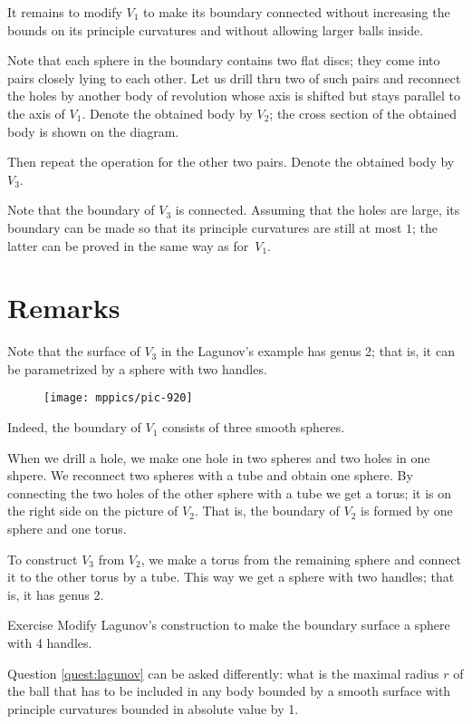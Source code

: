It remains to modify $V_1$ to make its boundary connected without increasing the bounds on its principle curvatures and  without allowing larger balls inside.

Note that each sphere in the boundary contains two flat discs;
they come into pairs closely lying to each other. 
Let us drill thru two of such pairs and reconnect the holes by another body of revolution whose 
axis is shifted but stays parallel to the axis of $V_1$.
Denote the obtained body by $V_2$; the cross section of the obtained body is shown on the diagram. 

Then repeat the operation for the other two pairs.
Denote the obtained body by $V_3$.

Note that the boundary of $V_3$ is connected.
Assuming that the holes are large, its boundary can be made so that its principle curvatures are still at most $1$; the latter can be proved in the same way as for~$V_1$.
\qeds

\section*{Remarks}

Note that the surface of $V_3$ in the Lagunov's example has genus 2;
that is, it can be parametrized by a sphere with two handles.

\begin{figure}[h!]
\centering
\texttt{[image: mppics/pic-920]}
\vskip0mm
\end{figure}

Indeed, the boundary of $V_1$ consists of three smooth spheres.

When we drill a hole, we make one hole in two spheres and two holes in one shpere.
We reconnect two spheres with a tube and obtain one sphere.
By connecting the two holes of the other sphere with a tube we get a torus;
it is on the right side on the picture of $V_2$.
That is, the boundary of $V_2$ is formed by one sphere and one torus.

To construct $V_3$ from $V_2$, we make a torus from the remaining sphere and connect it to the other torus by a tube.
This way we get a sphere with two handles; that is, it has genus 2.

\begin{thm}{Exercise}\label{ex:lagunov-genus4}
Modify Lagunov's construction to make the boundary surface a sphere with 4 handles.
\end{thm}

Question \ref{quest:lagunov} can be asked differently: what is the maximal radius $r$ of the ball that has to be included in any body bounded by a smooth surface with principle curvatures bounded in absolute value by 1.

